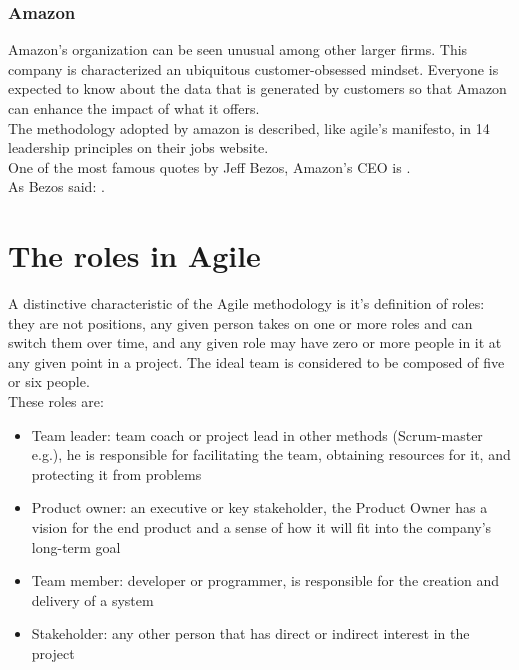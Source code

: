 	\subsubsection{Amazon}
		Amazon's organization can be seen unusual among other larger firms.
		This company is characterized an ubiquitous customer-obsessed mindset.
		Everyone is expected to know about the data that is generated by customers so that Amazon can enhance the impact of what it offers.\\		
		The methodology adopted by amazon is described, like agile's manifesto, in 14 leadership principles on their jobs website\cite{amazon_principles}.\\
		One of the most famous quotes by Jeff Bezos, Amazon's CEO is .\\
		As Bezos said: . 

\section{The roles in Agile}
	A distinctive characteristic of the Agile methodology is it's definition of roles: they are not positions, any given person takes on one or more roles and can switch them over time, and any given role may have zero or more people in it at any given point in a project\cite{agileRoles}.
	The ideal team is considered to be composed of five or six people.\\
	These roles are:
	\begin{itemize}
		\item Team leader: team coach or project lead in other methods (Scrum-master e.g.), he is responsible for facilitating the team, obtaining resources for it, and protecting it from problems
		\item Product owner: an executive or key stakeholder, the Product Owner has a vision for the end product and a sense of how it will fit into the company’s long-term goal
		\item Team member: developer or programmer, is responsible for the creation and delivery of a system
		\item Stakeholder: any other person that has direct or indirect interest in the project
	\end{itemize}

